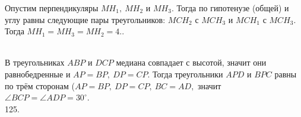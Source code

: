 \documentclass[12pt]{article}
\begin{document}
Опустим перпендикуляры $MH_1,\ MH_2$ и $MH_3.$ Тогда по гипотенузе (общей) и углу равны следующие пары треугольников: $MCH_2$ с $MCH_3$ и $MCH_1$ с $MCH_3.$ Тогда $MH_1=MH_3=MH_2=4.$\newpage{}. \begin{figure}[ht!]
\end{figure}\\
В треугольниках $ABP$ и $DCP$ медиана совпадает с высотой, значит они равнобедренные и $AP=BP,\ DP=CP.$ Тогда треугольники $APD$ и $BPC$ равны по трём сторонам ($AP=BP,\ DP=CP,\ BC=AD,$ значит $\angle BCP=\angle ADP=30^\circ.$\\
125. \begin{figure}[ht!]
\end{figure}\\
\end{document}

